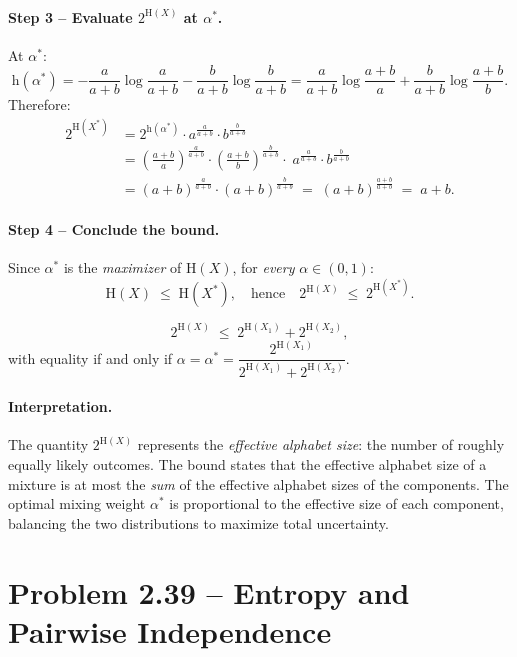 \documentclass[12pt,a4paper]{article}
\theoremstyle{plain}
\theoremstyle{definition}
\theoremstyle{remark}
\newcommand{\HH}{\mathrm{H}}
\newcommand{\hb}{\mathrm{h}}          %
\begin{document}
\paragraph{Step 3 – Evaluate $2^{\HH(X)}$ at $\alpha^*$.}

At $\alpha^*$:
\[
  \hb(\alpha^*)
    = -\frac{a}{a+b}\log\frac{a}{a+b} - \frac{b}{a+b}\log\frac{b}{a+b}
    = \frac{a}{a+b}\log\frac{a+b}{a} + \frac{b}{a+b}\log\frac{a+b}{b}.
\]
Therefore:
\begin{align*}
  2^{\HH(X^*)}
    &= 2^{\hb(\alpha^*)}\cdot a^{\tfrac{a}{a+b}}\cdot b^{\tfrac{b}{a+b}}\\[6pt]
    &= \left(\frac{a+b}{a}\right)^{\!\frac{a}{a+b}}
       \!\cdot\left(\frac{a+b}{b}\right)^{\!\frac{b}{a+b}}
       \!\cdot\; a^{\tfrac{a}{a+b}}\cdot b^{\tfrac{b}{a+b}}\\[6pt]
    &= (a+b)^{\tfrac{a}{a+b}}\cdot(a+b)^{\tfrac{b}{a+b}}
     \;=\; (a+b)^{\tfrac{a+b}{a+b}}
     \;=\; a+b.
\end{align*}

\paragraph{Step 4 – Conclude the bound.}

Since $\alpha^*$ is the \emph{maximizer} of $\HH(X)$, for \emph{every}
$\alpha\in(0,1)$:
\[
  \HH(X) \;\le\; \HH(X^*),
  \quad\text{hence}\quad
  2^{\HH(X)} \;\le\; 2^{\HH(X^*)}.
\]

\begin{resultbox}
\[
  \boxed{2^{\HH(X)} \;\le\; 2^{\HH(X_1)} + 2^{\HH(X_2)},}
\]
with equality if and only if $\alpha = \alpha^* = \dfrac{2^{\HH(X_1)}}{2^{\HH(X_1)}+2^{\HH(X_2)}}$.
\end{resultbox}

\paragraph{Interpretation.}
The quantity $2^{\HH(X)}$ represents the \emph{effective alphabet size}: the
number of roughly equally likely outcomes.  The bound states that the effective
alphabet size of a mixture is at most the \emph{sum} of the effective alphabet
sizes of the components.  The optimal mixing weight $\alpha^*$ is proportional
to the effective size of each component, balancing the two distributions to
maximize total uncertainty.

\newpage
\section{Problem 2.39 – Entropy and Pairwise Independence}
\end{document}
